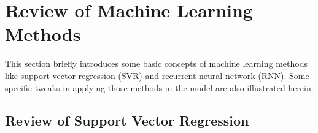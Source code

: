 \section{Review of Machine Learning Methods}
\label{sec:machine_learning_review}

This section briefly introduces some basic concepts of machine learning methods like support vector regression (SVR) and recurrent neural network (RNN). Some specific tweaks in applying those methods in the model are also illustrated herein.
\subsection{Review of Support Vector Regression}


